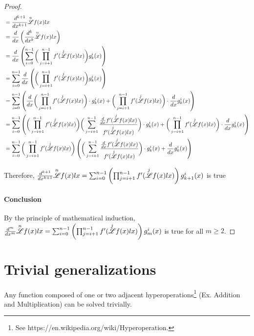 \documentclass[12pt, letterpaper]{article}
\begin{document}
\begin{proof}
    \begin{align*}
        &= \frac{d^{k+1}}{dx^{k+1}}\overset{n}{\mathscr{L}} f(x) lx \\
        &= \frac{d}{dx}\left(\frac{d^{k}}{dx^{k}}\overset{n}{\mathscr{L}} f(x) lx\right) \\
        &= \frac{d}{dx}\left(\sum^{n-1}_{i=0}\bigg(\prod^{n-1}_{j=i+1}f'(\overset{j}{\mathscr{L}}f(x)lx)\bigg)g^i_k(x)\right) \\
        &= \sum^{n-1}_{i=0}\frac{d}{dx}\left(\bigg(\prod^{n-1}_{j=i+1}f'(\overset{j}{\mathscr{L}}f(x)lx)\bigg)g^i_k(x)\right) \\
        &= \sum^{n-1}_{i=0}\left(\frac{d}{dx}\bigg(\prod^{n-1}_{j=i+1}f'(\overset{j}{\mathscr{L}}f(x)lx)\bigg)\cdot g^i_k(x)+\bigg(\prod^{n-1}_{j=i+1}f'(\overset{j}{\mathscr{L}}f(x)lx)\bigg)\cdot \frac{d}{dx}g^i_k(x)\right) \\
        &= \sum^{n-1}_{i=0}\left(\bigg(\prod^{n-1}_{j=i+1}f'(\overset{j}{\mathscr{L}}f(x)lx)\bigg)\bigg(\sum^{n-1}_{j=i+1}\frac{\frac{d}{dx}f'(\overset{j}{\mathscr{L}}f(x)lx)}{f'(\overset{j}{\mathscr{L}}f(x)lx)}\bigg)\cdot g^i_k(x)+\bigg(\prod^{n-1}_{j=i+1}f'(\overset{j}{\mathscr{L}}f(x)lx)\bigg)\cdot \frac{d}{dx}g^i_k(x)\right) \\
        &= \sum^{n-1}_{i=0}\bigg(\prod^{n-1}_{j=i+1}f'(\overset{j}{\mathscr{L}}f(x)lx)\bigg)\left(\bigg(\sum^{n-1}_{j=i+1}\frac{\frac{d}{dx}f'(\overset{j}{\mathscr{L}}f(x)lx)}{f'(\overset{j}{\mathscr{L}}f(x)lx)}\bigg)\cdot g^i_k(x)+\frac{d}{dx}g^i_k(x)\right) \\
    \end{align*}

    Therefore, $\frac{d^{k+1}}{dx^{k+1}}\overset{n}{\mathscr{L}} f(x) lx = \sum^{n-1}_{i=0}\left(\prod^{n-1}_{j=i+1}f'(\overset{j}{\mathscr{L}}f(x)lx)\right)g^i_{k+1}(x)$ is true

    \paragraph{Conclusion} By the principle of mathematical induction, \\$\frac{d^m}{dx^m}\overset{n}{\mathscr{L}} f(x) lx = \sum^{n-1}_{i=0}\left(\prod^{n-1}_{j=i+1}f'(\overset{j}{\mathscr{L}}f(x)lx)\right)g^i_m(x)$ is true for all $m \ge 2$.
    
\end{proof}
\newpage

\section{Trivial generalizations}
Any function composed of one or two adjacent hyperoperations\footnote{See https://en.wikipedia.org/wiki/Hyperoperation.} (Ex. Addition and Multiplication) can be solved trivially.
\end{document}
